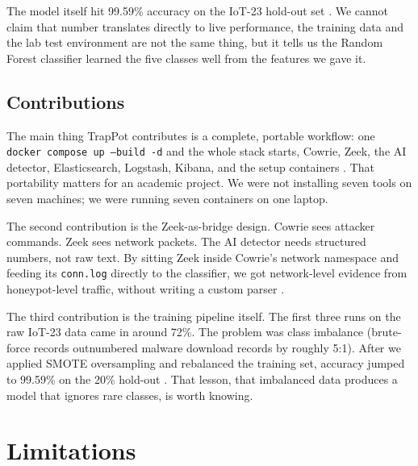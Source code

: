 The model itself hit 99.59\% accuracy on the IoT-23 hold-out set \cite{iot23dataset}. We cannot claim that number translates directly to live performance, the training data and the lab test environment are not the same thing, but it tells us the Random Forest classifier learned the five classes well from the features we gave it.

\subsection{Contributions}
\label{sub:contributions}

The main thing TrapPot contributes is a complete, portable workflow: one \texttt{docker compose up --build -d} and the whole stack starts, Cowrie, Zeek, the AI detector, Elasticsearch, Logstash, Kibana, and the setup containers \cite{9001068,lee2021classification}. That portability matters for an academic project. We were not installing seven tools on seven machines; we were running seven containers on one laptop.

The second contribution is the Zeek-as-bridge design. Cowrie sees attacker commands. Zeek sees network packets. The AI detector needs structured numbers, not raw text. By sitting Zeek inside Cowrie's network namespace and feeding its \texttt{conn.log} directly to the classifier, we got network-level evidence from honeypot-level traffic, without writing a custom parser \cite{franco2021survey,lanz2025optimizing}.

The third contribution is the training pipeline itself. The first three runs on the raw IoT-23 data came in around 72\%. The problem was class imbalance (brute-force records outnumbered malware download records by roughly 5:1). After we applied SMOTE oversampling and rebalanced the training set, accuracy jumped to 99.59\% on the 20\% hold-out \cite{saied2023comparative,karim2024efficient}. That lesson, that imbalanced data produces a model that ignores rare classes, is worth knowing.

\section{Limitations}
\label{sec:limitations}

